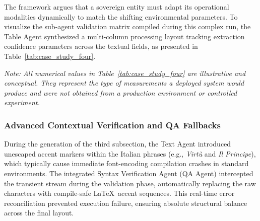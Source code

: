 The framework argues that a sovereign entity must adapt its operational modalities dynamically to match the shifting environmental parameters. To visualize the sub-agent validation matrix compiled during this complex run, the Table Agent synthesized a multi-column processing layout tracking extraction confidence parameters across the textual fields, as presented in Table~\ref{tab:case_study_four}.

\noindent\textit{Note: All numerical values in Table~\ref{tab:case_study_four} are illustrative and conceptual. They represent the type of measurements a deployed system would produce and were not obtained from a production environment or controlled experiment.}

\begin{table}[htbp]
\centering
\small
\caption{Sub-Agent Ingestion Confidence and Token Validation Profiles for Case Study IV (illustrative values).}
\label{tab:case_study_four}
\end{table}

\subsubsection{Advanced Contextual Verification and QA Fallbacks}
During the generation of the third subsection, the Text Agent introduced unescaped accent markers within the Italian phrases (e.g., \textit{Virt\`u} and \textit{Il Principe}), which typically cause immediate font-encoding compilation crashes in standard environments. The integrated Syntax Verification Agent (QA Agent) intercepted the transient stream during the validation phase, automatically replacing the raw characters with compile-safe \LaTeX\ accent sequences. This real-time error reconciliation prevented execution failure, ensuring absolute structural balance across the final layout.

